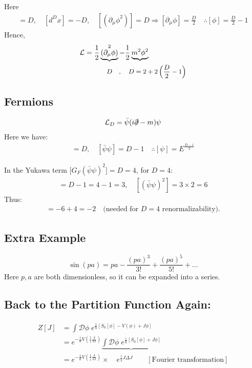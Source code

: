 \documentclass[14pt]{article} %
\begin{document}
Here
\begin{align*}
[\mathcal{L}]=D,\quad [d^D x] = -D, \quad [({\partial_\mu \phi}^2)] = D \Rightarrow [\partial_\mu \phi] =\frac D2 \quad\therefore [\phi] = \frac{D}{2} - 1
\end{align*}
Hence,
\begin{align}
\mathcal{L} = \frac12 &\underbrace{(\partial_\mu \phi)}^2 - \frac12 \underbrace{m^2 \phi^2} \\
& ~~~ \small{\text{\(D \quad,\quad D = 2 + 2\left( \frac{D}{2} - 1 \right)\)}}
\end{align}

\subsection*{Fermions}
\begin{align*}
\mathcal{L}_D = \bar{\psi}(i\slashed{\partial} - m)\psi
\end{align*}
Here we have:
\begin{align*}
[\bar{\psi} i\slashed{\partial} \psi] = D, \quad [\bar{\psi} \psi] = D-1 \quad \therefore [\psi] = E^{\frac{D-1}{2}}
\end{align*}

In the Yukawa term $\big[G_F (\bar{\psi}\psi)^2 \big]=D=4$, for $D=4$:
\begin{align*}
[\bar{\psi} \psi] = D-1 = 4-1=3, \quad [(\bar{\psi} \psi)^2] = 3 \times 2 = 6
\end{align*}
Thus:
\begin{align*}
[G_F] = -6+4=-2 \quad \text{(needed for $D=4$ renormalizability)}.
\end{align*}

\subsection*{Extra Example}
$$\sin(pa) = pa - \frac{(p a)^3}{3!} + \frac{(p a)^5}{5!} + \dots$$  
Here $p, a$ are both dimensionless, so it can be expanded into a series.

\subsection*{Back to the Partition Function Again:}
\begin{align*}
Z[J] &= \int \mathcal{D}\phi \; e^{\frac{i}{\hbar} \left[ S_0[\phi] - V(\phi) + J\phi \right]}
\\
&= e^{-\frac{i}{\hbar} V\left( \frac{1}{i} \frac{\delta}{\delta J} \right)}
\underbrace{\int \mathcal{D}\phi \; e^{\frac{i}{\hbar} \left[ S_0[\phi] + J \phi \right]}}
\\
&= e^{-\frac{i}{\hbar} V\left( \frac{1}{i} \frac{\delta}{\delta J} \right)}
\times \quad e^{\frac{i}{2} J \Delta J} \qquad [\text{Fourier transformation}]
\end{align*}
\end{document}

